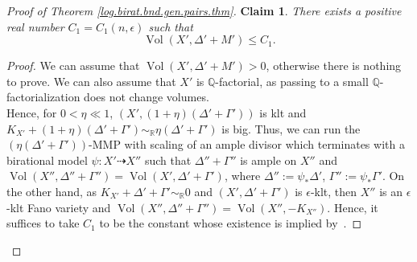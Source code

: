 \documentclass{amsart}[12pt,a4paper]
\theoremstyle{definition}
\DeclareMathOperator{\Vol}{\mathrm{Vol}}
\begin{document}
\begin{proof}[Proof of Theorem \ref{log.birat.bnd.gen.pairs.thm}]
{\bf Claim 1}. 
{\it There exists a positive real number $C_1=C_1(n, \epsilon)$ such that }
\[\Vol(X', \Delta'+M') \leq C_1.\]
\begin{proof}
We can assume that $\Vol(X', \Delta'+M') >0$, otherwise there is nothing to prove.
We can also assume that $X'$ is $\mathbb{Q}$-factorial, as passing to a small $\mathbb{Q}$-factorialization does not change volumes.\\
Hence, for $0<\eta\ll 1$, $(X', (1+\eta)(\Delta' + \Gamma'))$ is klt and $K_{X'}+(1+\eta)(\Delta' + \Gamma') \sim_\mathbb{R} \eta(\Delta' + \Gamma')$ is big.
Thus, we can run the $(\eta(\Delta' + \Gamma'))$-MMP with scaling of an ample divisor which terminates with a birational model $\psi \colon X' \dashrightarrow X''$ such that $\Delta'' + \Gamma''$ is ample on $X''$ and $\Vol(X'', \Delta'' + \Gamma'') = \Vol(X', \Delta' + \Gamma')$, where $\Delta'' := \psi_\ast \Delta'$, $\Gamma'':=\psi_\ast \Gamma'$.
On the other hand,  as $K_{X'}+\Delta' + \Gamma' \sim_\mathbb{R} 0$ and $(X', \Delta' + \Gamma')$ is $\epsilon$-klt, then $X''$ is an $\epsilon$-klt Fano variety and $\Vol(X'', \Delta'' + \Gamma'') = \Vol(X'', -K_{X''})$.
Hence, it suffices to take $C_1$ to be the constant whose existence is implied by~\cite[Theorem 2.11]{bir16bab}.
\end{proof}


\end{proof}
\end{document}
